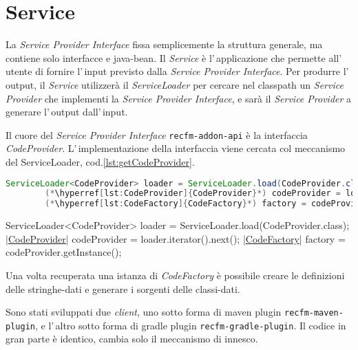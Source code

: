 %                                  

\chapter*{Service}
La \textsl{Service Provider Interface} fissa semplicemente la struttura 
generale, ma contiene solo interfacce e java-bean.
Il \textsl{Service} è l'\,applicazione che permette all'\,utente di fornire
l'\,input previsto dalla \textsl{Service Provider Interface}.
Per produrre l'\,output, il \textsl{Service} utilizzerà il 
\textsl{ServiceLoader} per cercare nel classpath un \textsl{Service Provider} 
che implementi la \textsl{Service Provider Interface}, e sarà il 
\textsl{Service Provider} a generare l'\,output dall'\,input.

Il cuore del \textsl{Service Provider Interface} \verb!recfm-addon-api! è la
interfaccia \textsl{CodeProvider}. L'\,implementazione della interfaccia
viene cercata col meccanismo del ServiceLoader, cod.\ref{lst:getCodeProvider}.

\ifesource
\begin{figure*}[!htb]
\begin{lstlisting}[language=java, caption=recupero del CodeProvider, 
label=lst:getCodeProvider]
        ServiceLoader<CodeProvider> loader = ServiceLoader.load(CodeProvider.class);
        (*\hyperref[lst:CodeProvider]{CodeProvider}*) codeProvider = loader.iterator().next();
        (*\hyperref[lst:CodeFactory]{CodeFactory}*) factory = codeProvider.getInstance();
\end{lstlisting}
\end{figure*}
\else
\begin{elisting}[!htb]
\begin{javacode}
        ServiceLoader<CodeProvider> loader = ServiceLoader.load(CodeProvider.class);
        |\hyperref[lst:CodeProvider]{CodeProvider}| codeProvider = loader.iterator().next();
        |\hyperref[lst:CodeFactory]{CodeFactory}| factory = codeProvider.getInstance();
\end{javacode}
\caption{recupero del CodeProvider}
\label{lst:getCodeProvider}
\end{elisting}
\fi

Una volta recuperata una istanza di \textsl{CodeFactory} è possibile creare le
definizioni delle stringhe-dati e generare i sorgenti delle classi-dati.

Sono stati sviluppati due \textsl{client}, uno sotto forma di maven plugin 
\verb!recfm-maven-plugin!, e l'\,altro sotto forma di gradle plugin 
\verb!recfm-gradle-plugin!. Il codice in gran parte è identico, cambia solo il 
meccanismo di innesco.
